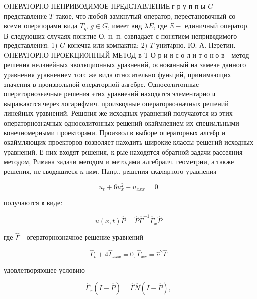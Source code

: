 \documentclass[10pt]{article}
\begin{document}
OПЕРАТОРНО НЕПРИВОДИМОЕ ПРЕДСТАВЛЕНИЕ г р у п п ы $G-$ представление $T$ такое, что любой замкнутый оператор, перестановочный со всеми операторами вида $T_{g}$, $g \in G$, имеет вид $\lambda E$, где $E-$ единичный оператор. В следуюших случаях понятие О. н. п. совпадает с понятием неприводимого представления: 1) $G$ конечна или компактна; 2) $T$ унитарно. Ю. А. Неретин. OПЕРАТОРНО ПРОЕКЦИОННЫЙ МЕТОД в Т О р и и с о л и т о н о в - метод решения нелинейных эволюционных уравнений, основанный на замене данного уравнения уравнением того же вида относительно функций, принимающих значения в произвольной операторной алгебре. Односолитонные операторнозначные решения этих уравнений находятся элементарно и выражаются через логарифмич. производные операторнозначных решений линейных уравнений. Решения же исходных уравнений получаются из этих операторнозначных односолитонных решений окаймлением их специальными конечномерными проекторами. Произвол в выборе операторных алгебр и окаймляющих проекторов позволяет находить широкие классы решений исходных уравнений. В них входят решения, к-рые находятся обратной задачи рассеяния методом, Римана задачи методом и методами алгебраич. геометрии, а также решения, не сводяшиеся к ним. Напр., решения скалярного уравнения



\[

u_{t}+6 u_{x}^{2}+u_{x x x}=0

\]



получаются в виде:



\[

u(x, t) \hat{P}=\hat{P} \hat{\Gamma}^{-1} \hat{\Gamma}_{x} \hat{P}

\]



где $\hat{\Gamma}$ - огераторнозначное решение уравнений



\[

\hat{\Gamma}_{t}+4 \hat{\Gamma}_{x x x}=0, \hat{\Gamma}_{x x}=\hat{a}^{2} \hat{\Gamma}

\]



удовлетворяющее условию



\[

\hat{\Gamma}_{x}(I-\hat{P})=\hat{\Gamma} \hat{N}(I-\hat{P}),

\]
\end{document}
